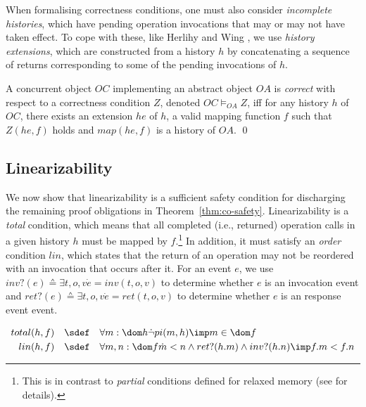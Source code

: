 \documentclass[11pt]{llncs}
\def \endbox{\hfill \qed}
\def \all  {\forall}
\newcommand{\refthm}[1]{Theorem~\ref{#1}}
\newcommand{\invoke}[3]{inv(#1, #2, #3)}
\newcommand{\return}[3]{ret(#1, #2, #3)}
\begin{document}
  When formalising correctness conditions, one must also consider
  \emph{incomplete histories}, which have pending operation
  invocations that may or may not have taken effect. To cope with
  these, like Herlihy and Wing \cite{Herlihy90}, we use \emph{history
    extensions}, which are constructed from a history $h$ by
  concatenating a sequence of returns corresponding to some of the
  pending invocations of $h$.
\begin{definition}
  A concurrent object $OC$ implementing an abstract object $OA$ is
  \emph{correct} with respect to a correctness condition $Z$, denoted
  $OC \models_{OA} Z$, iff for any history $h$ of $OC$, there exists
  an extension $he$ of $h$, a valid mapping function $f$ such that
  $Z(he, f)$ holds and $map(he, f)$ is a history of $OA$. \endbox
\end{definition}




\vspace{-4mm}



\subsection{Linearizability}
\label{sec:link-corr-cont}

We now show that linearizability is a sufficient safety condition for
discharging the remaining proof obligations in \refthm{thm:co-safety}.
Linearizability is a \emph{total} condition, which means that all
completed (i.e., returned) operation calls in a given history $h$ must
be mapped by $f$.\footnote{This is in contrast to \emph{partial}
  conditions defined for relaxed memory (see \cite{DDGS15-ECOOP} for
  details).} In addition, it must satisfy an \emph{order} condition
$lin$, which states that the return of an operation may not be
reordered with an invocation that occurs after it. For an event $e$,
we use $inv?(e) \sdef \exists t, o, v \dot e = \invoke{t}{o}{v}$ to
determine whether $e$ is an invocation event and
$ret?(e) \sdef \exists t, o, v \dot e = \return{t}{o}{v}$ to determine
whether $e$ is an response event event.  \smallskip

\noindent\hfill$\begin{array}{rcl}
  total(h, f) & \sdef & \all m : \dom h \dot \neg pi(m, h) \imp m \in
  \dom f \\[1mm]
  lin(h,f) & \sdef & \all m,n : \dom f \dot m < n \land  ret?(h.m)
  \land inv?(h.n) \imp f.m < f.n
\end{array}$\hfill{}
\end{document}
